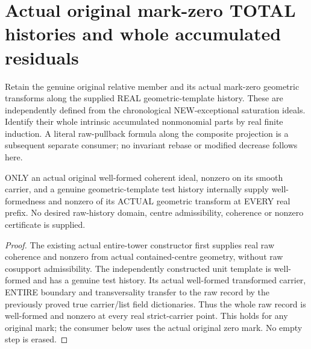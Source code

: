 \section{Actual original mark-zero TOTAL histories and whole accumulated residuals}

Retain the genuine original relative member and its actual mark-zero
geometric transforms along the supplied REAL geometric-template history.
These are independently defined from the chronological NEW-exceptional
saturation ideals. Identify their whole intrinsic accumulated nonmonomial
parts by real finite induction. A literal raw-pullback formula along the
composite projection is a subsequent separate consumer; no invariant
rebase or modified decrease follows here.

\begin{lemma}
\label{hir:sharp-actual-original-raw-total-history-geometry}
\leanok
ONLY an actual original well-formed coherent ideal, nonzero on
its smooth carrier, and a genuine geometric-template test history
internally supply well-formedness and nonzero of its ACTUAL geometric
transform at EVERY real prefix. No desired raw-history domain, centre
admissibility, coherence or nonzero certificate is supplied.
\end{lemma}
\begin{proof}
The existing actual entire-tower constructor first supplies real raw
coherence and nonzero from actual contained-centre geometry, without raw
cosupport admissibility. The independently constructed unit template is
well-formed and has a genuine test history. Its actual well-formed
transformed carrier, ENTIRE boundary and transversality transfer to the
raw record by the previously proved true carrier/list field dictionaries.
Thus the whole raw record is well-formed and nonzero at every real
strict-carrier point. This holds for any original mark; the consumer
below uses the actual original zero mark. No empty step is erased.
\end{proof}

